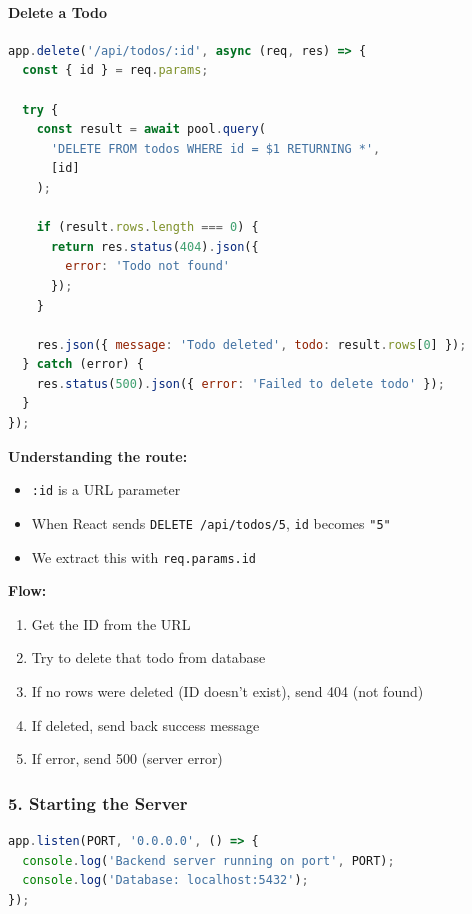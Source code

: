 \documentclass[12pt,a4paper]{article}
\begin{document}
\paragraph{Delete a Todo}

\begin{lstlisting}[language=JavaScript, caption=DELETE Todo]
app.delete('/api/todos/:id', async (req, res) => {
  const { id } = req.params;
  
  try {
    const result = await pool.query(
      'DELETE FROM todos WHERE id = $1 RETURNING *',
      [id]
    );
    
    if (result.rows.length === 0) {
      return res.status(404).json({ 
        error: 'Todo not found' 
      });
    }
    
    res.json({ message: 'Todo deleted', todo: result.rows[0] });
  } catch (error) {
    res.status(500).json({ error: 'Failed to delete todo' });
  }
});
\end{lstlisting}

\textbf{Understanding the route:}
\begin{itemize}
    \item \texttt{:id} is a URL parameter
    \item When React sends \texttt{DELETE /api/todos/5}, \texttt{id} becomes \texttt{"5"}
    \item We extract this with \texttt{req.params.id}
\end{itemize}

\textbf{Flow:}
\begin{enumerate}
    \item Get the ID from the URL
    \item Try to delete that todo from database
    \item If no rows were deleted (ID doesn't exist), send 404 (not found)
    \item If deleted, send back success message
    \item If error, send 500 (server error)
\end{enumerate}

\subsubsection{5. Starting the Server}

\begin{lstlisting}[language=JavaScript, caption=Server Start]
app.listen(PORT, '0.0.0.0', () => {
  console.log('Backend server running on port', PORT);
  console.log('Database: localhost:5432');
});
\end{lstlisting}
\end{document}
